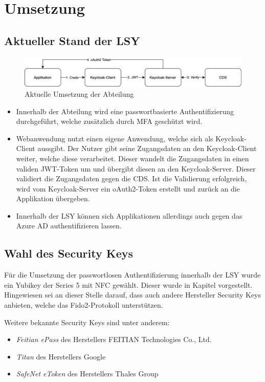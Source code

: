 \chapter{Umsetzung}

\section{Aktueller Stand der LSY}
\begin{figure}[h]
	\centering 
	\includegraphics[width=1\textwidth]{img/abbildungen/Unknown.png}
	\captionsetup{format=hang}
	\caption{Aktuelle Umsetzung der Abteilung}
\end{figure}

\begin{itemize}
    \item Innerhalb der Abteilung wird eine passwortbasierte Authentifizierung durchgeführt, welche zusätzlich durch \ac{MFA} geschützt wird.
    \item Webanwendung nutzt einen eigene Anwendung, welche sich als Keycloak-Client aussgibt. Der Nutzer gibt seine Zugangsdaten an den Keycloak-Client weiter, welche diese verarbeitet. Dieser wandelt die Zugangsdaten in einen validen JWT-Token um und übergibt diesen an den Keycloak-Server. Dieser validiert die Zugangsdaten gegen die \ac{CDS}. Ist die Validierung erfolgreich, wird vom Keycloak-Server ein oAuth2-Token erstellt und zurück an die Applikation übergeben.
    \item Innerhalb der \ac{LSY} können sich Applikationen allerdings auch gegen das Azure \ac{AD} authentifizieren lassen. 
\end{itemize}

\section{Wahl des Security Keys} \label{secwahl}
Für die Umsetzung der passwortlosen Authentifizierung innerhalb der \ac{LSY} wurde ein Yubikey der Series 5 mit NFC gewählt. Dieser wurde in Kapitel vorgestellt. Hingewiesen sei an dieser Stelle darauf, dass auch andere Hersteller Security Keys anbieten, welche das Fido2-Protokoll unterstützen. 

Weitere bekannte Security Keys sind unter anderem:
\begin{itemize}
    \item \textit{Feitian ePass} des Herstellers FEITIAN Technologies Co., Ltd.
    \item \textit{Titan} des Herstellers Google
    \item \textit{SafeNet eToken} des Herstellers Thales Group
\end{itemize}

